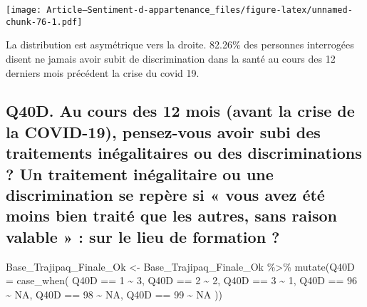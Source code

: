 \documentclass[
]{article}
\newenvironment{Shaded}{\begin{snugshade}}{\end{snugshade}}
\newcommand{\AttributeTok}[1]{\textcolor[rgb]{0.77,0.63,0.00}{#1}}
\newcommand{\ConstantTok}[1]{\textcolor[rgb]{0.00,0.00,0.00}{#1}}
\newcommand{\DecValTok}[1]{\textcolor[rgb]{0.00,0.00,0.81}{#1}}
\newcommand{\FunctionTok}[1]{\textcolor[rgb]{0.00,0.00,0.00}{#1}}
\newcommand{\NormalTok}[1]{#1}
\newcommand{\OtherTok}[1]{\textcolor[rgb]{0.56,0.35,0.01}{#1}}
\newcommand{\SpecialCharTok}[1]{\textcolor[rgb]{0.00,0.00,0.00}{#1}}
\begin{document}
\texttt{[image: Article---Sentiment-d-appartenance\_files/figure-latex/unnamed-chunk-76-1.pdf]}

La distribution est asymétrique vers la droite. 82.26\% des personnes
interrogées disent ne jamais avoir subit de discrimination dans la santé
au cours des 12 derniers mois précédent la crise du covid 19.

\hypertarget{q40d.-au-cours-des-12-mois-avant-la-crise-de-la-covid-19-pensez-vous-avoir-subi-des-traitements-inuxe9galitaires-ou-des-discriminations-un-traitement-inuxe9galitaire-ou-une-discrimination-se-repuxe8re-si-vous-avez-uxe9tuxe9-moins-bien-traituxe9-que-les-autres-sans-raison-valable-sur-le-lieu-de-formation}{%
\subsection{Q40D. Au cours des 12 mois (avant la crise de la COVID-19),
pensez-vous avoir subi des traitements inégalitaires ou des
discriminations ? Un traitement inégalitaire ou une discrimination se
repère si « vous avez été moins bien traité que les autres, sans raison
valable » : sur le lieu de formation
?}\label{q40d.-au-cours-des-12-mois-avant-la-crise-de-la-covid-19-pensez-vous-avoir-subi-des-traitements-inuxe9galitaires-ou-des-discriminations-un-traitement-inuxe9galitaire-ou-une-discrimination-se-repuxe8re-si-vous-avez-uxe9tuxe9-moins-bien-traituxe9-que-les-autres-sans-raison-valable-sur-le-lieu-de-formation}}

\begin{Shaded}
\begin{Highlighting}[]
\NormalTok{Base\_Trajipaq\_Finale\_Ok }\OtherTok{\textless{}{-}}
\NormalTok{  Base\_Trajipaq\_Finale\_Ok }\SpecialCharTok{\%\textgreater{}\%}
  \FunctionTok{mutate}\NormalTok{(}\AttributeTok{Q40D =} \FunctionTok{case\_when}\NormalTok{(}
\NormalTok{    Q40D }\SpecialCharTok{==} \DecValTok{1} \SpecialCharTok{\textasciitilde{}} \DecValTok{3}\NormalTok{,}
\NormalTok{    Q40D }\SpecialCharTok{==} \DecValTok{2} \SpecialCharTok{\textasciitilde{}} \DecValTok{2}\NormalTok{,}
\NormalTok{    Q40D }\SpecialCharTok{==} \DecValTok{3} \SpecialCharTok{\textasciitilde{}} \DecValTok{1}\NormalTok{,}
\NormalTok{    Q40D }\SpecialCharTok{==} \DecValTok{96} \SpecialCharTok{\textasciitilde{}} \ConstantTok{NA}\NormalTok{,}
\NormalTok{    Q40D }\SpecialCharTok{==} \DecValTok{98} \SpecialCharTok{\textasciitilde{}} \ConstantTok{NA}\NormalTok{,}
\NormalTok{    Q40D }\SpecialCharTok{==} \DecValTok{99} \SpecialCharTok{\textasciitilde{}} \ConstantTok{NA}
\NormalTok{  ))}
\end{Highlighting}
\end{Shaded}
\end{document}
